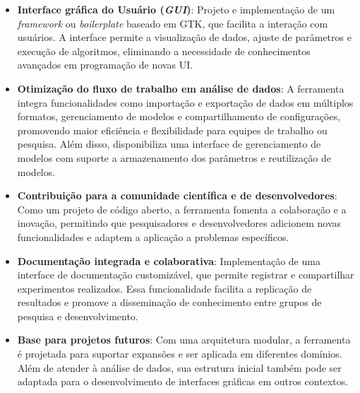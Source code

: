 \begin{itemize}
    \item \textbf{Interface gráfica do Usuário (\textit{GUI})}: Projeto e implementação de um \textit{framework} ou \textit{boilerplate} baseado em GTK, que facilita a interação com usuários. A interface permite a visualização de dados, ajuste de parâmetros e execução de algoritmos, eliminando a necessidade de conhecimentos avançados em programação de novas UI.

    \item \textbf{Otimização do fluxo de trabalho em análise de dados}: A ferramenta integra funcionalidades como importação e exportação de dados em múltiplos formatos, gerenciamento de modelos e compartilhamento de configurações, promovendo maior eficiência e flexibilidade para equipes de trabalho ou pesquisa. Além disso, disponibiliza uma interface de gerenciamento de modelos com suporte a armazenamento dos parâmetros e reutilização de modelos.

    \item \textbf{Contribuição para a comunidade científica e de desenvolvedores}: Como um projeto de código aberto, a ferramenta fomenta a colaboração e a inovação, permitindo que pesquisadores e desenvolvedores adicionem novas funcionalidades e adaptem a aplicação a problemas específicos.

    \item \textbf{Documentação integrada e colaborativa}: Implementação de uma interface de documentação customizável, que permite registrar e compartilhar experimentos realizados. Essa funcionalidade facilita a replicação de resultados e promove a disseminação de conhecimento entre grupos de pesquisa e desenvolvimento.

    \item \textbf{Base para projetos futuros}: Com uma arquitetura modular, a ferramenta é projetada para suportar expansões e ser aplicada em diferentes domínios. Além de atender à análise de dados, sua estrutura inicial também pode ser adaptada para o desenvolvimento de interfaces gráficas em outros contextos.
\end{itemize}


